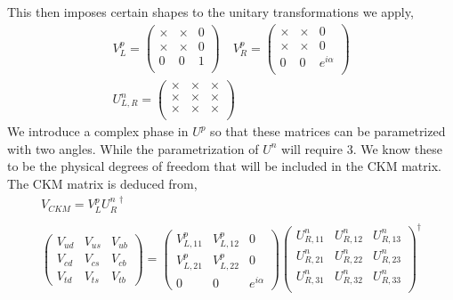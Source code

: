 This then imposes certain shapes to the unitary transformations we apply,
\begin{equation}
\begin{gathered}
V^{p}_{L} = \begin{pmatrix}
\times & \times & 0 \\ 
\times & \times & 0 \\
0 & 0 & 1 \\ 
\end{pmatrix} \quad  V^{p}_{R} = \begin{pmatrix}
\times & \times & 0 \\ 
\times & \times & 0 \\
0 & 0 & e^{i\alpha}  \\ 
\end{pmatrix}  \\ 
U^{n}_{L,R} = 
\begin{pmatrix}
\times & \times & \times \\ 
\times & \times & \times \\
\times & \times & \times \\
\end{pmatrix}
\end{gathered} 
\end{equation}
We introduce a complex phase in $U^p$ so that these matrices can be parametrized with two angles. While the parametrization of $U^n$ will require 3. We know these to be the physical degrees of freedom that will be included in the CKM matrix. The CKM matrix is deduced from, 
\begin{equation}
\begin{gathered}
V_{CKM} = V_L^p U_R^{n\, \dagger}  \\ 
\\
\begin{pmatrix}
V_{ud} & V_{us} & V_{ub} \\
V_{cd} & V_{cs} & V_{cb} \\ 
V_{td} & V_{ts} & V_{tb} 
\end{pmatrix}  = \begin{pmatrix}
V_{L,11}^p & V_{L,12}^p & 0 \\ 
V_{L,21}^p & V_{L,22}^p & 0 \\ 
0 & 0 & e^{i \alpha} 
\end{pmatrix} \begin{pmatrix}
U_{R,11}^n & U_{R,12}^n & U_{R,13}^n \\
U_{R,21}^n & U_{R,22}^n & U_{R,23}^n \\
U_{R,31}^n & U_{R,32}^n & U_{R,33}^n \\
\end{pmatrix} ^\dagger 
\end{gathered} 
\end{equation}


